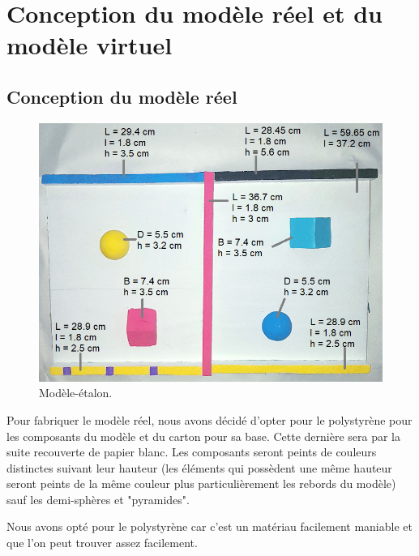 \documentclass[a4paper, 12pt]{book}
\begin{document}
\section{Conception du modèle réel et du modèle virtuel}
\subsection{Conception du modèle réel}
\begin{center}
	\begin{figure}[htbp]
  		\hspace{0.75cm}
 		\includegraphics[scale=0.5]{images/realModel.png} \hspace{2cm}
  		\caption{Modèle-étalon.\label{fig-model}}
	\end{figure}
\end{center}

Pour fabriquer le modèle réel, nous avons décidé d'opter pour le polystyrène pour les composants du modèle et du carton pour sa base. Cette dernière sera par la suite recouverte de papier blanc. Les composants seront peints de couleurs distinctes suivant leur hauteur (les éléments qui possèdent une même hauteur seront peints de la même couleur plus particulièrement les rebords du modèle) sauf les demi-sphères et "pyramides".
\par Nous avons opté pour le polystyrène car c'est un matériau facilement maniable et que l'on peut trouver assez facilement. 
\end{document}
